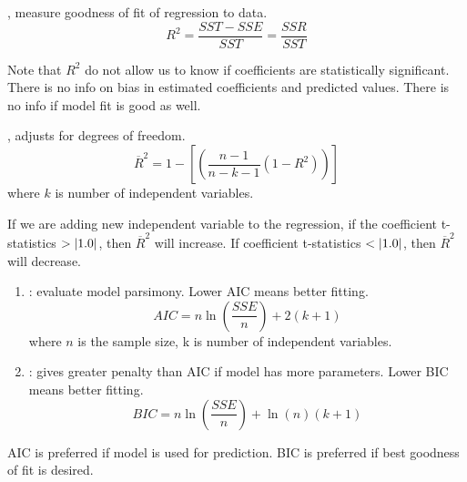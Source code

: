 \begin{definition} , measure goodness of fit of regression to data.
\begin{equation}
R^2 = \frac{SST - SSE}{SST} = \frac{SSR}{SST} \nonumber
\end{equation}
\end{definition}

Note that $R^2$ do not allow us to know if coefficients are statistically significant. There is no info on bias in estimated coefficients and predicted values. There is no info if model fit is good as well.

\begin{definition} , adjusts for degrees of freedom.
\begin{equation}
\overline{R}^2 = 1 - \left[\left(\frac{n-1}{n-k-1} (1-R^2) \right) \right] \nonumber
\end{equation}
where $k$ is number of independent variables.
\end{definition}

If we are adding new independent variable to the regression, if the coefficient t-statistics $> \left\lvert1.0\right\rvert$, then $\overline{R}^2$ will increase. If coefficient t-statistics $< \left\lvert1.0\right\rvert$, then $\overline{R}^2$ will decrease.

\begin{definition} 
\begin{enumerate}[label=\roman*.]
\setlength{\itemsep}{0pt}
\item {}: evaluate model parsimony. Lower AIC means better fitting.
\begin{equation}
AIC = n \ln(\frac{SSE}{n}) + 2(k+1) \nonumber
\end{equation}
where $n$ is the sample size, k is number of independent variables.
\item {}: gives greater penalty than AIC if model has more parameters. Lower BIC means better fitting.
\begin{equation}
BIC = n \ln(\frac{SSE}{n}) + \ln(n)(k+1) \nonumber
\end{equation}
\end{enumerate}
\end{definition}

AIC is preferred if model is used for prediction. BIC is preferred if best goodness of fit is desired.

